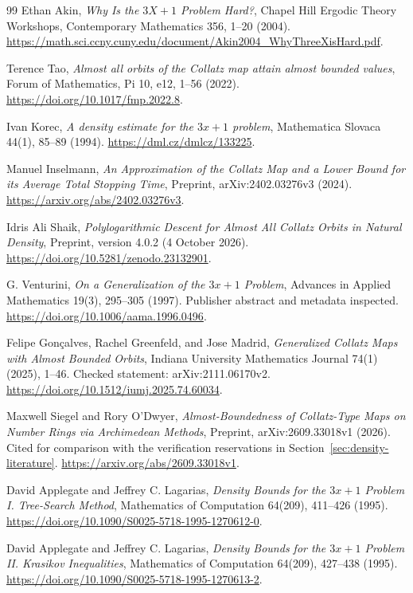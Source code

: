 \begin{thebibliography}{99}
Ethan Akin,
\emph{Why Is the $3X+1$ Problem Hard?},
Chapel Hill Ergodic Theory Workshops, Contemporary Mathematics 356, 1--20 (2004).
\url{https://math.sci.ccny.cuny.edu/document/Akin2004_WhyThreeXisHard.pdf}.

Terence Tao,
\emph{Almost all orbits of the Collatz map attain almost bounded values},
Forum of Mathematics, Pi 10, e12, 1--56 (2022).
\url{https://doi.org/10.1017/fmp.2022.8}.

Ivan Korec,
\emph{A density estimate for the $3x+1$ problem},
Mathematica Slovaca 44(1), 85--89 (1994).
\url{https://dml.cz/dmlcz/133225}.

Manuel Inselmann,
\emph{An Approximation of the Collatz Map and a Lower Bound for its Average Total Stopping Time},
Preprint, arXiv:2402.03276v3 (2024).
\url{https://arxiv.org/abs/2402.03276v3}.

Idris Ali Shaik,
\emph{Polylogarithmic Descent for Almost All Collatz Orbits in Natural Density},
Preprint, version 4.0.2 (4 October 2026).
\url{https://doi.org/10.5281/zenodo.23132901}.

G. Venturini,
\emph{On a Generalization of the $3x+1$ Problem},
Advances in Applied Mathematics 19(3), 295--305 (1997).
Publisher abstract and metadata inspected.
\url{https://doi.org/10.1006/aama.1996.0496}.

Felipe Gon\c{c}alves, Rachel Greenfeld, and Jose Madrid,
\emph{Generalized Collatz Maps with Almost Bounded Orbits},
Indiana University Mathematics Journal 74(1) (2025), 1--46.
Checked statement: arXiv:2111.06170v2.
\url{https://doi.org/10.1512/iumj.2025.74.60034}.

Maxwell Siegel and Rory O'Dwyer,
\emph{Almost-Boundedness of Collatz-Type Maps on Number Rings via Archimedean Methods},
Preprint, arXiv:2609.33018v1 (2026). Cited for comparison with the
verification reservations in Section~\ref{sec:density-literature}.
\url{https://arxiv.org/abs/2609.33018v1}.

David Applegate and Jeffrey C. Lagarias,
\emph{Density Bounds for the $3x+1$ Problem I. Tree-Search Method},
Mathematics of Computation 64(209), 411--426 (1995).
\url{https://doi.org/10.1090/S0025-5718-1995-1270612-0}.

David Applegate and Jeffrey C. Lagarias,
\emph{Density Bounds for the $3x+1$ Problem II. Krasikov Inequalities},
Mathematics of Computation 64(209), 427--438 (1995).
\url{https://doi.org/10.1090/S0025-5718-1995-1270613-2}.


\end{thebibliography}
